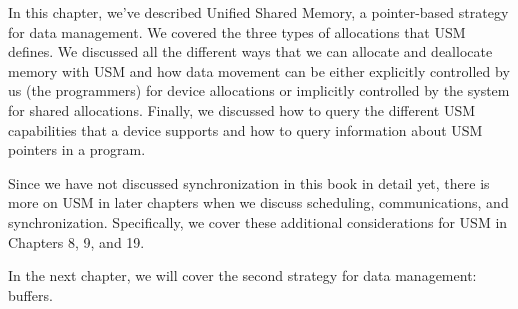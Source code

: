 In this chapter, we’ve described Unified Shared Memory, a pointer-based strategy for data management. We covered the three types of allocations that USM defines. We discussed all the different ways that we can allocate and deallocate memory with USM and how data movement can be either explicitly controlled by us (the programmers) for device allocations or implicitly controlled by the system for shared allocations. Finally, we discussed how to query the different USM capabilities that a device supports and how to query information about USM pointers in a program.\par

Since we have not discussed synchronization in this book in detail yet, there is more on USM in later chapters when we discuss scheduling, communications, and synchronization. Specifically, we cover these additional considerations for USM in Chapters 8, 9, and 19.\par

In the next chapter, we will cover the second strategy for data management: buffers.\par

\newpage
